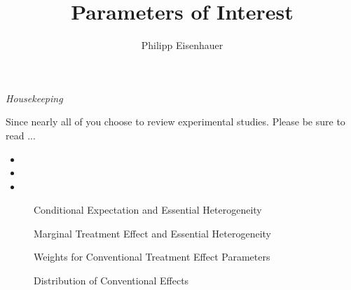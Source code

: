 

\title{Parameters of Interest}
\author{Philipp Eisenhauer}

\date{}

\let\otp\titlepage


\maketitle

\begin{frame}\begin{center}
\LARGE\textit{Housekeeping}
\end{center}\end{frame}

\begin{frame}
Since nearly all of you choose to review experimental studies. Please be sure to read ...

\begin{itemize}
\item {}
\item {}
\item {}
\end{itemize}
\end{frame}

\begin{frame}
\begin{figure}\caption{Conditional Expectation and Essential Heterogeneity}
\end{figure}
\end{frame}

\begin{frame}
\begin{figure}\caption{Marginal Treatment Effect and Essential Heterogeneity}
\end{figure}
\end{frame}

\begin{frame}
\begin{figure}\caption{Weights for Conventional Treatment Effect Parameters}
\end{figure}
\end{frame}


\begin{frame}
\begin{figure}\caption{Distribution of Conventional Effects}
\end{figure}
\end{frame}

